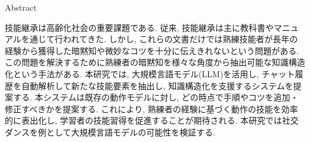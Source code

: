 \centerline{Abstract}
技能継承は高齢化社会の重要課題である. 従来, 技能継承は主に教科書やマニュアルを通じて行われてきた. しかし, これらの文書だけでは熟練技能者が長年の経験から獲得した暗黙知や微妙なコツを十分に伝えきれないという問題がある. この問題を解決するために熟練者の暗黙知を様々な角度から抽出可能な知識構造化という手法がある. 本研究では, 大規模言語モデル(LLM)を活用し, チャット履歴を自動解析して新たな技能要素を抽出し, 知識構造化を支援するシステムを提案する. 本システムは既存の動作モデルに対し, どの時点で手順やコツを追加・修正すべきかを提案する. これにより, 熟練者の経験に基づく動作の技能を効率的に表出化し, 学習者の技能習得を促進することが期待される. 本研究では社交ダンスを例として大規模言語モデルの可能性を検証する. 
\clearpage